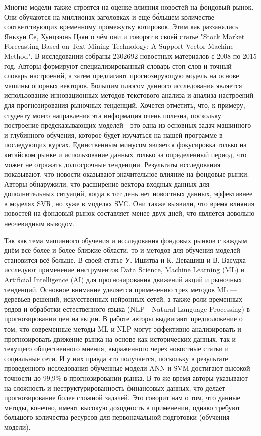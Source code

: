 \documentclass[14pt]{extarticle}
\begin{document}
Многие модели также строятся на оценке влияния новостей на фондовый рынок. Они обучаются на миллионах заголовках и ещё б\'{о}льшем количестве соответствующих временному промежутку котировок. Этим как раззанялись Яньхун Се, Хунцзюнь Цзян \cite{Xie_2017} о чём они и говорят в своей статье "Stock Market Forecasting Based on Text Mining Technology: A Support Vector Machine Method". В исследовании собраны 2302692 новостных материалов с 2008 по 2015 год. Авторы формируют специализированный словарь стоп-слов и точный словарь настроений, а затем предлагают прогнозирующую модель на основе машины опорных векторов. Большим плюсом данного исследования является использование инновационных методов текстового анализа и анализа настроений для прогнозирования рыночных тенденций. Хочется отметить, что, к примеру, студенту моего направления эта информация очень полезна, поскольку построение предсказывающих моделей - это одна из основных задач машинного и глубинного обучения, которое будет изучаться на нашей программе в последующих курсах. Единственным минусом является фокусировка только на китайском рынке и использование данных только за определенный период, что может не отражать долгосрочные тенденции. Результаты исследования показывают, что новости оказывают значительное влияние на фондовые рынки. Авторы обнаружили, что расширение вектора входных данных для дополнительных ситуаций, когда в тот день нет новостных данных, эффективнее в моделях SVR, но хуже в моделях SVC. Они также выявили, что время влияния новостей на фондовый рынок составляет менее двух дней, что является довольно неочевидным выводом.

Так как тема машинного обучения и исследования фондовых рынков с каждым днём всё более и более близкие области, то и методов для обучения моделей становится всё больше. В своей статье\cite{upadhyaytechnical} У. Ишитва и К. Девашиш и В. Васудха исследуют применение инструментов Data Science, Machine Learning (ML) и Artificial Intelligence (AI) для прогнозирования движений акций и рыночных тенденций. Основное внимание уделяется применению трех методов ML — деревьев решений, искусственных нейронных сетей, а также роли временных рядов и обработки естественного языка (NLP - Natural Language Processing) в прогнозировании цен на акции. В работе авторы выдвигают предположение о том, что современные методы ML и NLP могут эффективно анализировать и прогнозировать движение рынка на основе как исторических данных, так и текущего общественного мнения, выраженного через новостные статьи и социальные сети. И у них правда это получается, поскольку в результате проведенного исследования обученные модели ANN и SVM достигают высокой точности до 99,9\% в прогнозировании рынка. В то же время авторы указывают на сложность и неструктурированность финансовых данных, что делает прогнозирование более сложной задачей. Это говорит нам о том, что данные методы, конечно, имеют высокую доходность в применении, однако требуют большого количества ресурсов для первоначальной подготовки (обучения модели).
\end{document}
